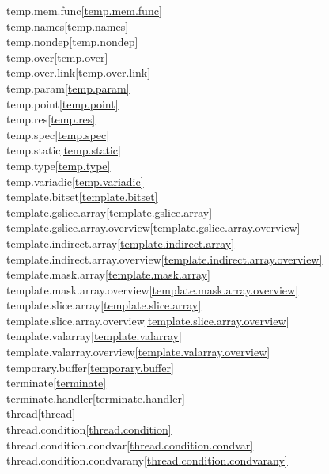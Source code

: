 \begin{multicols}{2}
temp.mem.func\quad\ref{temp.mem.func}\\
temp.names\quad\ref{temp.names}\\
temp.nondep\quad\ref{temp.nondep}\\
temp.over\quad\ref{temp.over}\\
temp.over.link\quad\ref{temp.over.link}\\
temp.param\quad\ref{temp.param}\\
temp.point\quad\ref{temp.point}\\
temp.res\quad\ref{temp.res}\\
temp.spec\quad\ref{temp.spec}\\
temp.static\quad\ref{temp.static}\\
temp.type\quad\ref{temp.type}\\
temp.variadic\quad\ref{temp.variadic}\\
template.bitset\quad\ref{template.bitset}\\
template.gslice.array\quad\ref{template.gslice.array}\\
template.gslice.array.overview\quad\ref{template.gslice.array.overview}\\
template.indirect.array\quad\ref{template.indirect.array}\\
template.indirect.array.overview\quad\ref{template.indirect.array.overview}\\
template.mask.array\quad\ref{template.mask.array}\\
template.mask.array.overview\quad\ref{template.mask.array.overview}\\
template.slice.array\quad\ref{template.slice.array}\\
template.slice.array.overview\quad\ref{template.slice.array.overview}\\
template.valarray\quad\ref{template.valarray}\\
template.valarray.overview\quad\ref{template.valarray.overview}\\
temporary.buffer\quad\ref{temporary.buffer}\\
terminate\quad\ref{terminate}\\
terminate.handler\quad\ref{terminate.handler}\\
thread\quad\ref{thread}\\
thread.condition\quad\ref{thread.condition}\\
thread.condition.condvar\quad\ref{thread.condition.condvar}\\
thread.condition.condvarany\quad\ref{thread.condition.condvarany}\\

\end{multicols}

